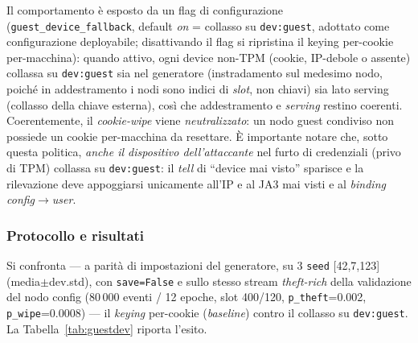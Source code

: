 \documentclass[11pt,a4paper]{report}
\begin{document}
Il comportamento è esposto da un flag di configurazione (\texttt{guest\_device\_fallback}, default \emph{on} = collasso su \texttt{dev:guest}, adottato come configurazione deployabile; disattivando il flag si ripristina il keying per-cookie per-macchina): quando attivo, ogni device non-TPM (cookie, IP-debole o assente) collassa su \texttt{dev:guest} sia nel generatore (instradamento sul medesimo nodo, poiché in addestramento i nodi sono indici di \textit{slot}, non chiavi) sia lato serving (collasso della chiave esterna), così che addestramento e \textit{serving} restino coerenti. Coerentemente, il \textit{cookie-wipe} viene \emph{neutralizzato}: un nodo guest condiviso non possiede un cookie per-macchina da resettare. È importante notare che, sotto questa politica, \emph{anche il dispositivo dell'attaccante} nel furto di credenziali (privo di TPM) collassa su \texttt{dev:guest}: il \textit{tell} di ``device mai visto'' sparisce e la rilevazione deve appoggiarsi unicamente all'IP e al JA3 mai visti e al \textit{binding} \textit{config}$\rightarrow$\textit{user}.

\subsubsection{Protocollo e risultati}

Si confronta --- a parità di impostazioni del generatore, su 3 \texttt{seed} [42,7,123] (media$\pm$dev.std), con \texttt{save=False} e sullo stesso stream \emph{theft-rich} della validazione del nodo config (80\,000 eventi / 12 epoche, slot 400/120, \texttt{p\_theft}=0.002, \texttt{p\_wipe}=0.0008) --- il \textit{keying} per-cookie (\emph{baseline}) contro il collasso su \texttt{dev:guest}. La Tabella~\ref{tab:guestdev} riporta l'esito.
\end{document}
